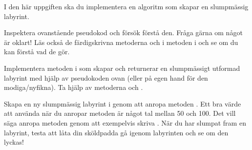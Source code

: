 



\Task I den här uppgiften ska du implementera en algoritm som skapar en slumpmässig labyrint.

\Subtask Inspektera ovanstående pseudokod och försök förstå den. Fråga gärna om något är oklart! Läs också de färdigskrivna metoderna  och  i metoden  i  och se om du kan förstå vad de gör.

\Subtask Implementera metoden  i  som skapar och returnerar en slumpmässigt utformad labyrint med hjälp av pseudokoden ovan (eller på egen hand för den modiga/nyfikna). Ta hjälp av metoderna  och .

\Subtask Skapa en ny slumpmässig labyrint i  genom att anropa metoden . Ett bra värde att använda när du anropar metoden är något tal mellan 50 och 100. Det vill säga anropa metoden genom att exempelvis skriva . När du har slumpat fram en labyrint, testa att låta din sköldpadda gå igenom labyrinten och se om den lyckas!

